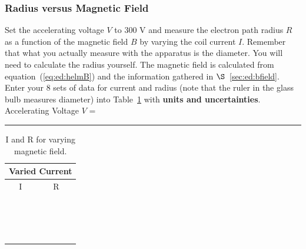 \vfill 
\newpage

\subsubsection{Radius versus Magnetic Field}
\label{sec:ed:varyB}

Set the accelerating voltage $V$ to 300 V and measure the electron 
path radius $R$ as a function of the magnetic field $B$ by varying the coil 
current $I$.  Remember that what you actually measure with the apparatus is
the diameter. You will need to calculate the radius yourself. The 
magnetic field is calculated from equation~(\ref{eq:ed:helmB}) and the 
information gathered in $\S$~\ref{sec:ed:bfield}. 
Enter your 8 sets of data for current and radius (note that the ruler
in the glass bulb measures diameter) into Table~\ref{tab:ed:varyb} with
{\bf units and uncertainties}.\\

\hspace{3cm} Accelerating Voltage $V$ =~\rule{3cm}{.1mm}  


\begin{table}[htb]
\begin{center}
\begin{tabular}{|c|c|}
\hline
\multicolumn{2}{|c|}{Varied Current}\\
\hline
I & R \\
\hline
\hspace*{5cm} & \hspace*{5cm} \\
& \\
\hline       
& \\
& \\
\hline
& \\
& \\
\hline
& \\
& \\
\hline
& \\
& \\
\hline
& \\
& \\
\hline
& \\
& \\
\hline
& \\
& \\
\hline
\end{tabular}
\end{center}
\caption{I and R for varying magnetic field.}
\label{tab:ed:varyb}
\end{table}

